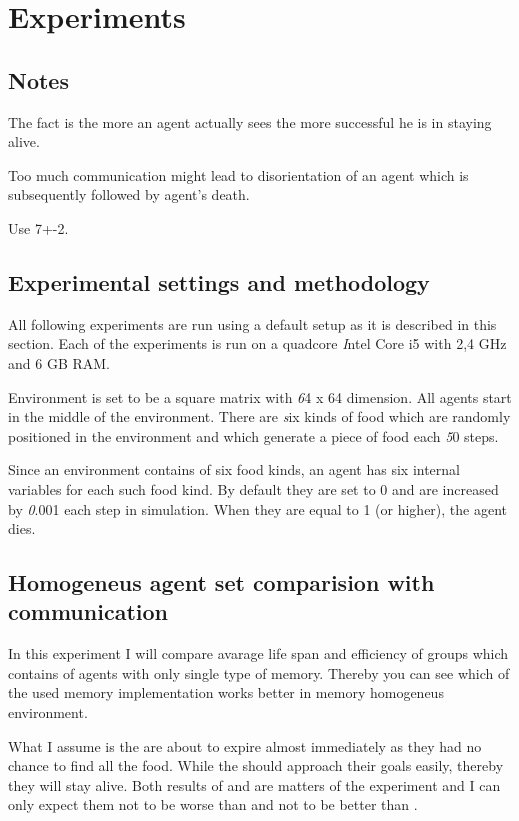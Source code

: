 \chapter{Experiments}

\section{Notes}

The fact is the more an agent actually sees the more successful he is in staying alive.

Too much communication might lead to disorientation of an agent which is subsequently followed by agent's death.

Use 7+-2.

\section{Experimental settings and methodology}

All following experiments are run using a default setup as it is described in this section. Each of the experiments is run on a quadcore {\emph Intel Core i5 with 2,4 GHz and 6 GB RAM}. 

Environment is set to be a square matrix with {\emph 64 x 64 dimension}. All agents start in the middle of the environment. There are {\emph six kinds of food} which are randomly positioned in the environment and which generate a piece of food each {\emph 50 steps}.

Since an environment contains of six food kinds, an agent has six internal variables for each such food kind. By default they are set to 0 and are increased by {\emph 0.001 each step} in simulation. When they are equal to 1 (or higher), the agent dies.  

\section{Homogeneus agent set comparision with communication}

In this experiment I will compare avarage life span and efficiency of groups which contains of agents with only single type of memory. Thereby you can see which of the used memory implementation works better in memory homogeneus environment.

What I assume is the  are about to expire almost immediately as they had no chance to find all the food. While the  should approach their goals easily, thereby they will stay alive. Both results of  and  are matters of the experiment and I can only expect them not to be worse than  and not to be better than .     

